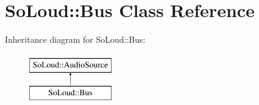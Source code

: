 \hypertarget{class_so_loud_1_1_bus}{}\section{So\+Loud\+::Bus Class Reference}
\label{class_so_loud_1_1_bus}
Inheritance diagram for So\+Loud\+::Bus\+:\begin{figure}[H]
\begin{center}
\leavevmode
\includegraphics[height=2.000000cm]{class_so_loud_1_1_bus}
\end{center}
\end{figure}
